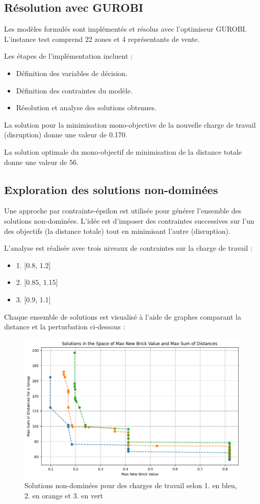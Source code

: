\subsection{Résolution avec GUROBI}
Les modèles formulés sont implémentés et résolus avec l'optimiseur GUROBI. L'instance test comprend 22 zones et 4 représentants de vente.

Les étapes de l'implémentation incluent :
\begin{itemize}
    \item Définition des variables de décision.
    \item Définition des contraintes du modèle.
    \item Résolution et analyse des solutions obtenues.
\end{itemize}

La solution pour la minimisation mono-objective de la nouvelle charge de travail (disruption) donne une valeur de 0.170.

La solution optimale du mono-objectif de minimisation de la distance totale donne une valeur de 56. 

\subsection{Exploration des solutions non-dominées}
Une approche par contrainte-épsilon est utilisée pour générer l’ensemble des solutions non-dominées. L’idée est d’imposer des contraintes successives sur l’un des objectifs (la distance totale)  tout en minimisant l’autre (disruption).

L’analyse est réalisée avec trois niveaux de contraintes sur la charge de travail :
\begin{itemize}
    \item 1. [0.8, 1.2]
    \item 2. [0.85, 1.15]
    \item 3. [0.9, 1.1]
\end{itemize}

Chaque ensemble de solutions est visualisé à l’aide de graphes comparant la distance et la perturbation ci-dessous :

\begin{figure}[H]
    \centering
    \includegraphics[width=\textwidth]{Images/step_1/step_1-min-distance.png}
    \caption{Solutions non-dominées pour des charges de travail selon 1. en bleu, 2. en orange et 3. en vert}
    \label{fig:nom_de_reference}
\end{figure}
